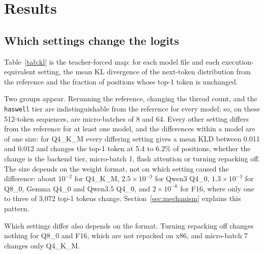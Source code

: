 \section{Results}
\label{sec:results}

\subsection{Which settings change the logits}
Table~\ref{tab:kl} is the teacher-forced map: for each model file and each execution-equivalent
setting, the mean KL divergence of the next-token distribution from the reference and the
fraction of positions whose top-1 token is unchanged.

\begin{table}[t]
\centering\scriptsize
\caption{Teacher-forced divergence from the reference configuration on 12 chunks of 512 WikiText
tokens. Each cell is mean KLD / top-1 agreement (\%). ``$=$'' marks a setting that is
indistinguishable from the reference at the tool's storage precision (mean $|$KLD$|$ $\le
10^{-6}$ and 100\% top-1 agreement) for 512-token sequences; Section~\ref{sec:ubshape} shows
that micro-batches 8 and 64 do differ at other lengths. Reference: \texttt{alderlake}, 4 threads, micro-batch 512, flash
attention off, repack on.}
\label{tab:kl}

\end{table}

Two groups appear. Rerunning the reference, changing the thread count, and the
\texttt{haswell} tier are indistinguishable from the reference for every model; so, on these
512-token sequences, are micro-batches of 8 and 64. Every other setting differs from the reference for at least one
model, and the differences within a model are of one size: for Q4\_K\_M every differing setting
gives a mean KLD between 0.011 and 0.012 and changes the top-1 token at 5.4 to 6.2\% of
positions, whether the change is the backend tier, micro-batch 1, flash attention or turning
repacking off. The size depends on the weight format, not on which setting caused the
difference: about $10^{-2}$ for Q4\_K\_M, $2.5\times10^{-3}$ for Qwen3 Q4\_0, $1.3\times10^{-3}$
for Q8\_0, Gemma Q4\_0 and Qwen3.5 Q4\_0, and $2\times10^{-6}$ for F16, where only one to three
of 3,072 top-1 tokens change. Section~\ref{sec:mechanism} explains this pattern.

Which settings differ also depends on the format. Turning repacking off changes nothing for
Q8\_0 and F16, which are not repacked on x86, and micro-batch 7 changes only Q4\_K\_M.

